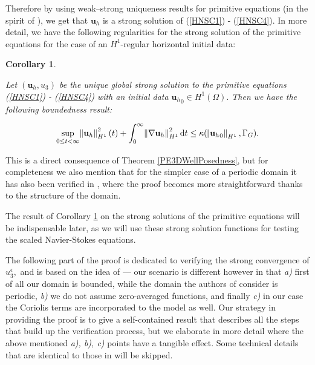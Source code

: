 \documentclass[11pt, a4paper]{article}
\newtheorem{corollary}{Corollary}
\newcommand*\diff{\mathop{}\!\mathrm{d}}
\begin{document}
Therefore by using weak--strong uniqueness results for primitive equations (in the spirit of \cite{GNT2019}), we get that $\mathbf{u}_h$ is a strong solution of (\ref{HNSC1}) - (\ref{HNSC4}).
In more detail, we have the following regularities for the strong solution of the primitive equations for the case of an $H^1$-regular horizontal initial data:

\begin{corollary} \label{StrongSolPE_boundedness}

Let $(\mathbf{u}_h,u_3)$ be the unique global strong solution to the primitive equations (\ref{HNSC1}) - (\ref{HNSC4}) with an initial data ${\mathbf{u}_h}_0 \in H^1(\Omega).$ Then we have the following boundedness result:

$$ \sup_{0 \leq t < \infty} \norm{\mathbf{u}_h}_{H^1}^2 (t) + \int_0^\infty \norm{\nabla \mathbf{u}_h}_{H^1}^2 \diff t \leq \kappa (\norm{{\mathbf{u}_h}_0}_{H^1}, \Gamma_G).$$

\end{corollary}

This is a direct consequence of Theorem \ref{PE3DWellPosedness}, but for completeness we also mention that for the simpler case of a periodic domain it has also been verified in \cite{li2019primitive}, where the proof becomes more straightforward thanks to the structure of the domain.

The result of Corollary \ref{StrongSolPE_boundedness} on the strong solutions of the primitive equations will be indispensable later, as we will use these strong solution functions for testing the scaled Navier-Stokes equations.

The following part of the proof is dedicated to verifying the strong convergence of $u_3^\epsilon,$ and is based on the idea of \cite{li2019primitive} --- our scenario is different however in that \textit{a)} first of all our domain is bounded, while the domain the authors of \cite{li2019primitive} consider is periodic, \textit{b)} we do not assume zero-averaged functions, and finally \textit{c)} in our case the Coriolis terms are incorporated to the model as well. Our strategy in providing the proof is to give a self-contained result that describes all the steps that build up the verification process, but we elaborate in more detail where the above mentioned \textit{a), b), c)} points have a tangible effect. Some technical details that are identical to those in \cite{li2019primitive} will be skipped.
\end{document}
